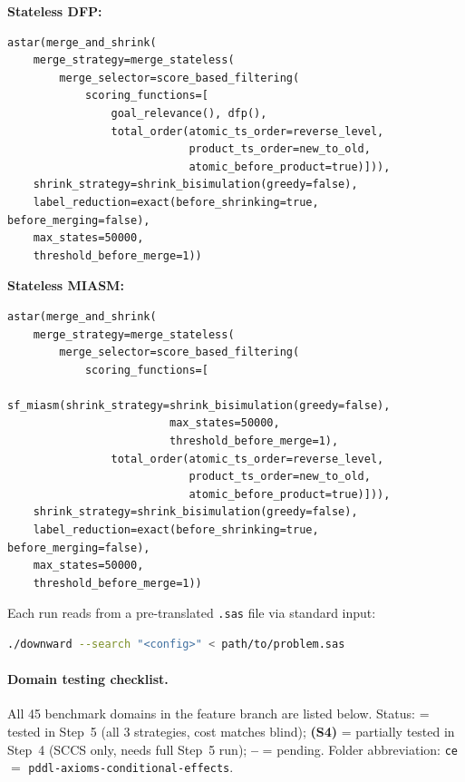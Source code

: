 \documentclass[11pt,a4paper]{article}
\begin{document}
\begin{itemize}
    \noindent\textbf{Stateless DFP:}
\begin{lstlisting}
astar(merge_and_shrink(
    merge_strategy=merge_stateless(
        merge_selector=score_based_filtering(
            scoring_functions=[
                goal_relevance(), dfp(),
                total_order(atomic_ts_order=reverse_level,
                            product_ts_order=new_to_old,
                            atomic_before_product=true)])),
    shrink_strategy=shrink_bisimulation(greedy=false),
    label_reduction=exact(before_shrinking=true, before_merging=false),
    max_states=50000,
    threshold_before_merge=1))
\end{lstlisting}

    \noindent\textbf{Stateless MIASM:}
\begin{lstlisting}
astar(merge_and_shrink(
    merge_strategy=merge_stateless(
        merge_selector=score_based_filtering(
            scoring_functions=[
                sf_miasm(shrink_strategy=shrink_bisimulation(greedy=false),
                         max_states=50000,
                         threshold_before_merge=1),
                total_order(atomic_ts_order=reverse_level,
                            product_ts_order=new_to_old,
                            atomic_before_product=true)])),
    shrink_strategy=shrink_bisimulation(greedy=false),
    label_reduction=exact(before_shrinking=true, before_merging=false),
    max_states=50000,
    threshold_before_merge=1))
\end{lstlisting}

    \noindent Each run reads from a pre-translated \texttt{.sas} file via
    standard input:
\begin{lstlisting}[language=bash]
./downward --search "<config>" < path/to/problem.sas
\end{lstlisting}

    \paragraph{Domain testing checklist.}

    All 45 benchmark domains in the feature branch are listed below.
    Status: \textbf{\checkmark} = tested in Step~5 (all 3 strategies, cost
    matches blind); \textbf{(S4)} = partially tested in Step~4 (SCCS only,
    needs full Step~5 run); \textbf{--} = pending.
    Folder abbreviation: \texttt{ce} $=$ \texttt{pddl-axioms-conditional-effects}.


\end{itemize}
\end{document}
